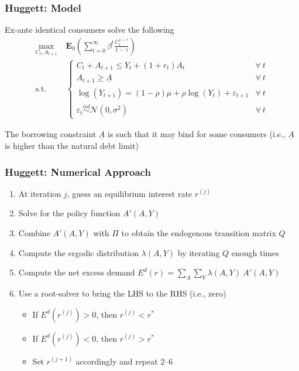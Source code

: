 \documentclass[10pt, aspectratio=1610, natbib, handout]{beamer}
\newcommand{\E}{\mathbf{E}}
\begin{document}
  \begin{frame}
    \frametitle{Huggett: Model}

    Ex-ante identical consumers solve the following
    \begin{align*}
      \max_{C_t, A_{t+1}} &\; \E_0 \left( \sum_{t=0}^{\infty} \beta^t \frac{C_t^{1-\gamma}}{1-\gamma} \right) \\
      \text{s.t.} &\;
      \begin{cases}
        C_t + A_{t+1} \leq Y_t + (1 + r_t) A_t & \forall\ t \\
        A_{t+1} \geq \underline{A} & \forall\ t \\
        \log(Y_{t+1}) = (1 - \rho) \mu + \rho \log(Y_t) + \varepsilon_{t+1} & \forall\ t \\
        \varepsilon_{t} \overset{iid}{\sim} \mathcal{N}(0, \sigma^2) & \forall\ t
      \end{cases}
    \end{align*}

    \vfill\pause

    The borrowing constraint $\underline{A}$ is such that it may bind for some consumers (i.e., $\underline{A}$ is higher than the natural debt limit)

  \end{frame}

  \begin{frame}
    \frametitle{Huggett: Numerical Approach}

    \begin{enumerate}
      \item At iteration $j$, guess an equilibrium interest rate $r^{(j)}$
      \vfill\pause
      \item Solve for the policy function $A'(A, Y)$
      \vfill\pause
      \item Combine $A'(A, Y)$ with $\Pi$ to obtain the endogenous transition matrix $Q$
      \vfill\pause
      \item Compute the ergodic distribution $\lambda(A, Y)$ by iterating $Q$ enough times
      \vfill\pause
      \item Compute the net excess demand $E^d(r) = \sum_A \sum_Y \lambda(A, Y)\ A'(A, Y)$
      \vfill\pause
      \item Use a root-solver to bring the LHS to the RHS (i.e., zero)
        \begin{itemize}
          \item If $E^d \left( r^{(j)} \right) > 0$, then $r^{(j)} < r^*$
          \item If $E^d \left( r^{(j)} \right) < 0$, then $r^{(j)} > r^*$
          \item Set $r^{(j+1)}$ accordingly and repeat 2--6
        \end{itemize}
    \end{enumerate}

  \end{frame}
\end{document}
